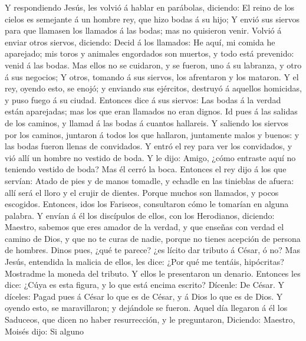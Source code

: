  Y respondiendo Jesús, les volvió á hablar en parábolas,
diciendo:  El reino de los cielos es semejante á un hombre
rey, que hizo bodas á su hijo;  Y envió sus siervos para
que llamasen los llamados á las bodas; mas no quisieron venir.
 Volvió á enviar otros siervos, diciendo: Decid á los
llamados: He aquí, mi comida he aparejado; mis toros y animales
engordados son muertos, y todo está prevenido: venid á las bodas.
 Mas ellos no se cuidaron, y se fueron, uno á su labranza,
y otro á sus negocios;  Y otros, tomando á sus siervos,
los afrentaron y los mataron.  Y el rey, oyendo esto, se
enojó; y enviando sus ejércitos, destruyó á aquellos homicidas, y puso
fuego á su ciudad.  Entonces dice á sus siervos: Las bodas
á la verdad están aparejadas; mas los que eran llamados no eran dignos.
 Id pues á las salidas de los caminos, y llamad á las
bodas á cuantos hallareis.  Y saliendo los siervos por
los caminos, juntaron á todos los que hallaron, juntamente malos y
buenos: y las bodas fueron llenas de convidados.  Y entró
el rey para ver los convidados, y vió allí un hombre no vestido de boda.
 Y le dijo: Amigo, ¿cómo entraste aquí no teniendo
vestido de boda? Mas él cerró la boca.  Entonces el rey
dijo á los que servían: Atado de pies y de manos tomadle, y echadle en
las tinieblas de afuera: allí será el lloro y el crujir de dientes.
 Porque muchos son llamados, y pocos escogidos.
 Entonces, idos los Fariseos, consultaron cómo le
tomarían en alguna palabra.  Y envían á él los discípulos
de ellos, con los Herodianos, diciendo: Maestro, sabemos que eres amador
de la verdad, y que enseñas con verdad el camino de Dios, y que no te
curas de nadie, porque no tienes acepción de persona de hombres.
 Dinos pues, ¿qué te parece? ¿es lícito dar tributo á
César, ó no?  Mas Jesús, entendida la malicia de ellos,
les dice: ¿Por qué me tentáis, hipócritas?  Mostradme la
moneda del tributo. Y ellos le presentaron un denario. 
Entonces les dice: ¿Cúya es esta figura, y lo que está encima escrito?
 Dícenle: De César. Y díceles: Pagad pues á César lo que
es de César, y á Dios lo que es de Dios.  Y oyendo esto,
se maravillaron; y dejándole se fueron.  Aquel día
llegaron á él los Saduceos, que dicen no haber resurrección, y le
preguntaron,  Diciendo: Maestro, Moisés dijo: Si alguno
